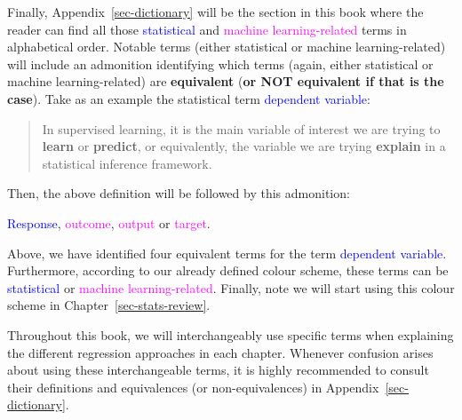 \documentclass[
  letterpaper,
  DIV=11,
  numbers=noendperiod]{scrreprt}
\newcounter{quartocalloutnteno}
\newcommand{\quartocalloutnte}[1]{\refstepcounter{quartocalloutnteno}\label{#1}}
\begin{document}
Finally, Appendix~\ref{sec-dictionary} will be the section in this book
where the reader can find all those \textcolor{blue}{statistical} and
\textcolor{magenta}{machine learning-related} terms in alphabetical
order. Notable terms (either statistical or machine learning-related)
will include an admonition identifying which terms (again, either
statistical or machine learning-related) are \textbf{equivalent}
(\textbf{or NOT equivalent if that is the case}). Take as an example the
statistical term \textcolor{blue}{dependent variable}:

\begin{quote}
In supervised learning, it is the main variable of interest we are
trying to \textbf{learn} or \textbf{predict}, or equivalently, the
variable we are trying \textbf{explain} in a statistical inference
framework.
\end{quote}

Then, the above definition will be followed by this admonition:

\begin{tcolorbox}[enhanced jigsaw, bottomrule=.15mm, breakable, colback=white, leftrule=.75mm, coltitle=black, rightrule=.15mm, bottomtitle=1mm, title=\textcolor{quarto-callout-warning-color}{\faExclamationTriangle}\hspace{0.5em}{Equivalent to:}, opacitybacktitle=0.6, toprule=.15mm, titlerule=0mm, arc=.35mm, colbacktitle=quarto-callout-warning-color!10!white, toptitle=1mm, colframe=quarto-callout-warning-color-frame, left=2mm, opacityback=0]

\textcolor{blue}{Response}, \textcolor{magenta}{outcome},
\textcolor{magenta}{output} or \textcolor{magenta}{target}.

\end{tcolorbox}

Above, we have identified four equivalent terms for the term
\textcolor{blue}{dependent variable}. Furthermore, according to our
already defined colour scheme, these terms can be
\textcolor{blue}{statistical} or
\textcolor{magenta}{machine learning-related}. Finally, note we will
start using this colour scheme in Chapter~\ref{sec-stats-review}.

\begin{tcolorbox}[enhanced jigsaw, bottomrule=.15mm, breakable, colback=white, leftrule=.75mm, coltitle=black, rightrule=.15mm, bottomtitle=1mm, title=\textcolor{quarto-callout-note-color}{\faInfo}\hspace{0.5em}{Note \ref*{nte-use-terminology}: Heads-up on the use of terminology!}, opacitybacktitle=0.6, toprule=.15mm, titlerule=0mm, arc=.35mm, colbacktitle=quarto-callout-note-color!10!white, toptitle=1mm, colframe=quarto-callout-note-color-frame, left=2mm, opacityback=0]

\quartocalloutnte{nte-use-terminology} 

Throughout this book, we will interchangeably use specific terms when
explaining the different regression approaches in each chapter. Whenever
confusion arises about using these interchangeable terms, it is highly
recommended to consult their definitions and equivalences (or
non-equivalences) in Appendix~\ref{sec-dictionary}.

\end{tcolorbox}
\end{document}
